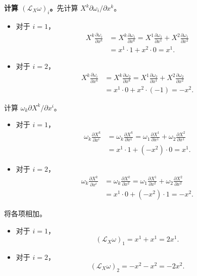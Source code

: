 \textbf{计算 $(\mathcal L_X\omega)_i$。}先计算 $X^k\partial\omega_i/\partial x^k$。
\begin{itemize}
  \item 对于 $i=1$，
  \[
    \begin{aligned}
      X^k\frac{\partial\omega_i}{\partial x^k}
      &=X^k\frac{\partial\omega_1}{\partial x^k}
       =X^1\frac{\partial\omega_1}{\partial x^1}
        +X^2\frac{\partial\omega_1}{\partial x^2}\\
      &=x^1\cdot1+x^2\cdot0=x^1.
    \end{aligned}
  \]
  \item 对于 $i=2$，
  \[
    \begin{aligned}
      X^k\frac{\partial\omega_i}{\partial x^k}
      &=X^k\frac{\partial\omega_2}{\partial x^k}
       =X^1\frac{\partial\omega_2}{\partial x^1}
        +X^2\frac{\partial\omega_2}{\partial x^2}\\
      &=x^1\cdot0+x^2\cdot(-1)=-x^2.
    \end{aligned}
  \]
\end{itemize}
计算 $\omega_k\partial X^k/\partial x^i$。
\begin{itemize}
  \item 对于 $i=1$，
  \[
    \begin{aligned}
      \omega_k\frac{\partial X^k}{\partial x^i}
      &=\omega_k\frac{\partial X^k}{\partial x^1}
       =\omega_1\frac{\partial X^1}{\partial x^1}
        +\omega_2\frac{\partial X^2}{\partial x^1}\\
      &=x^1\cdot1+(-x^2)\cdot0=x^1.
    \end{aligned}
  \]
  \item 对于 $i=2$，
  \[
    \begin{aligned}
      \omega_k\frac{\partial X^k}{\partial x^i}
      &=\omega_k\frac{\partial X^k}{\partial x^2}
       =\omega_1\frac{\partial X^1}{\partial x^2}
        +\omega_2\frac{\partial X^2}{\partial x^2}\\
      &=x^1\cdot0+(-x^2)\cdot1=-x^2.
    \end{aligned}
  \]
\end{itemize}

将各项相加。
\begin{itemize}
  \item 对于 $i=1$，
  \[
    (\mathcal L_X\omega)_1=x^1+x^1=2x^1.
  \]
  \item 对于 $i=2$，
  \[
    (\mathcal L_X\omega)_2=-x^2-x^2=-2x^2.
  \]
\end{itemize}


